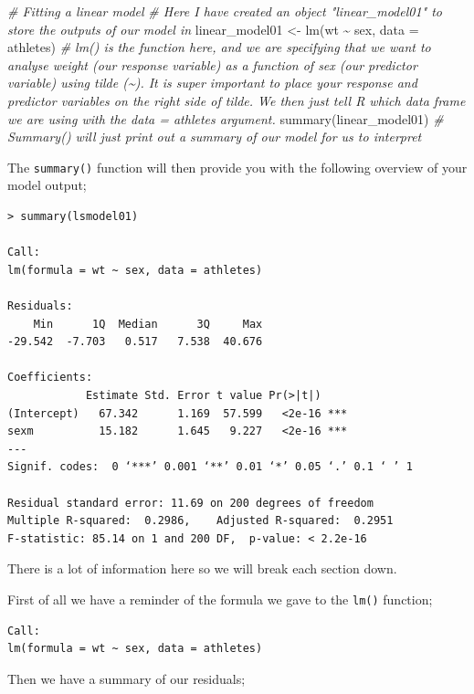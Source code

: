 \documentclass[
]{book}
\newenvironment{Shaded}{\begin{snugshade}}{\end{snugshade}}
\newcommand{\AttributeTok}[1]{\textcolor[rgb]{0.77,0.63,0.00}{#1}}
\newcommand{\CommentTok}[1]{\textcolor[rgb]{0.56,0.35,0.01}{\textit{#1}}}
\newcommand{\FunctionTok}[1]{\textcolor[rgb]{0.00,0.00,0.00}{#1}}
\newcommand{\NormalTok}[1]{#1}
\newcommand{\OtherTok}[1]{\textcolor[rgb]{0.56,0.35,0.01}{#1}}
\newcommand{\SpecialCharTok}[1]{\textcolor[rgb]{0.00,0.00,0.00}{#1}}
\begin{document}
\begin{Shaded}
\begin{Highlighting}[]
\CommentTok{\# Fitting a linear model }
\CommentTok{\# Here I have created an object "linear\_model01" to store the outputs of our model in}
\NormalTok{linear\_model01 }\OtherTok{\textless{}{-}} \FunctionTok{lm}\NormalTok{(wt }\SpecialCharTok{\textasciitilde{}}\NormalTok{ sex, }\AttributeTok{data =}\NormalTok{ athletes) }\CommentTok{\# lm() is the function here, and we are specifying that we want to analyse weight (our response variable) as a function of sex (our predictor variable) using tilde (\textasciitilde{}). It is super important to place your response and predictor variables on the right side of tilde. We then just tell R which data frame we are using with the data = athletes argument. }
\FunctionTok{summary}\NormalTok{(linear\_model01) }\CommentTok{\# Summary() will just print out a summary of our model for us to interpret }
\end{Highlighting}
\end{Shaded}

The \texttt{summary()} function will then provide you with the following overview of your model output;

\begin{verbatim}
> summary(lsmodel01)

Call:
lm(formula = wt ~ sex, data = athletes)

Residuals:
    Min      1Q  Median      3Q     Max 
-29.542  -7.703   0.517   7.538  40.676 

Coefficients:
            Estimate Std. Error t value Pr(>|t|)    
(Intercept)   67.342      1.169  57.599   <2e-16 ***
sexm          15.182      1.645   9.227   <2e-16 ***
---
Signif. codes:  0 ‘***’ 0.001 ‘**’ 0.01 ‘*’ 0.05 ‘.’ 0.1 ‘ ’ 1

Residual standard error: 11.69 on 200 degrees of freedom
Multiple R-squared:  0.2986,    Adjusted R-squared:  0.2951 
F-statistic: 85.14 on 1 and 200 DF,  p-value: < 2.2e-16
\end{verbatim}

There is a lot of information here so we will break each section down.

First of all we have a reminder of the formula we gave to the \texttt{lm()} function;

\begin{verbatim}
Call:
lm(formula = wt ~ sex, data = athletes)
\end{verbatim}

Then we have a summary of our residuals;
\end{document}
